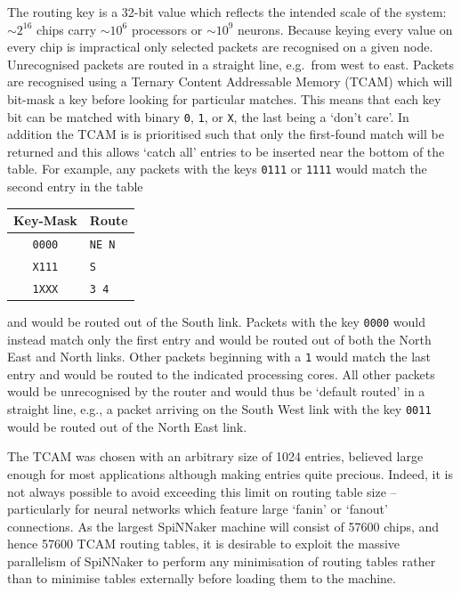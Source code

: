\documentclass[conference]{IEEEtran}
\newcommand{\mytt}[1]{\texttt{\footnotesize#1}}
\begin{document}
The routing key is a 32-bit value which reflects the intended scale of the system: $\sim2^{16}$ chips carry $\sim10^6$ processors or $\sim10^9$ neurons.
Because keying every value on every chip is impractical only selected packets are recognised on a given node.
Unrecognised packets are routed in a straight line, e.g.\ from west to east.
Packets are recognised using a Ternary Content Addressable Memory (TCAM) which will bit-mask a key before looking for particular matches.
This means that each key bit can be matched with binary \mytt{0}, \mytt{1}, or \mytt{X}, the last being a `don't care'.
In addition the TCAM is is prioritised such that only the first-found match will be returned and this allows `catch all' entries to be inserted near the bottom of the table.
For example, any packets with the keys \mytt{0111} or \mytt{1111} would match the second entry in the table

\begin{table}[H]
  \centering
  \begin{tabular}{c l}
    \toprule
    Key-Mask & Route \\
    \midrule
    \texttt{0000} & \texttt{NE N}\\
    \texttt{X111} & \texttt{S}\\
    \texttt{1XXX} & \texttt{3 4}\\
    \bottomrule
  \end{tabular}
\end{table}

\noindent and would be routed out of the South link.
Packets with the key \mytt{0000} would instead match only the first entry and would be routed out of both the North East and North links.
Other packets beginning with a \mytt{1} would match the last entry and would be routed to the indicated processing cores.
All other packets would be unrecognised by the router and would thus be `default routed' in a straight line, e.g., a packet arriving on the South West link with the key \mytt{0011} would be routed out of the North East link.

The TCAM was chosen with an arbitrary size of 1024 entries, believed large enough for most applications although making entries quite precious.
Indeed, it is not always possible to avoid exceeding this limit on routing table size -- particularly for neural networks which feature large `fanin' or `fanout' connections.
As the largest SpiNNaker machine will consist of \num{57600} chips, and hence \num{57600} TCAM routing tables, it is desirable to exploit the massive parallelism of SpiNNaker to perform any minimisation of routing tables rather than to minimise tables externally before loading them to the machine.
\end{document}
